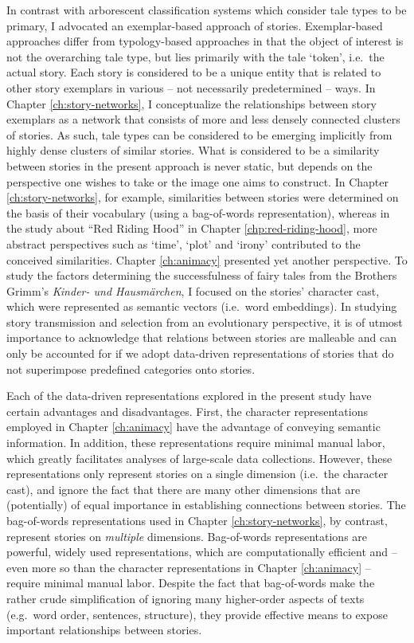 In contrast with arborescent classification systems which consider tale types to be primary, I advocated an exemplar-based approach of stories. Exemplar-based approaches differ from typology-based approaches in that the object of interest is not the overarching tale type, but lies primarily with the tale `token', i.e.\ the actual story\autocite[119]{frank:2010}. Each story is considered to be a unique entity that is related to other story exemplars in various -- not necessarily predetermined -- ways. In Chapter \ref{ch:story-networks}, I conceptualize the relationships between story exemplars as a network that consists of more and less densely connected clusters of stories. As such, tale types can be considered to be emerging implicitly from highly dense clusters of similar stories. What is considered to be a similarity between stories in the present approach is never static, but depends on the perspective one wishes to take or the image one aims to construct. In Chapter \ref{ch:story-networks}, for example, similarities between stories were determined on the basis of their vocabulary (using a bag-of-words representation), whereas in the study about ``Red Riding Hood'' in Chapter \ref{chp:red-riding-hood}, more abstract perspectives such as `time', `plot' and `irony' contributed to the conceived similarities. Chapter \ref{ch:animacy} presented yet another perspective. To study the factors determining the successfulness of fairy tales from the Brothers Grimm's \emph{Kinder- und Hausmärchen}, I focused on the stories' character cast, which were represented as semantic vectors (i.e.\ word embeddings). In studying story transmission and selection from an evolutionary perspective, it is of utmost importance to acknowledge that relations between stories are malleable and can only be accounted for if we adopt data-driven representations of stories that do not superimpose predefined categories onto stories.

Each of the data-driven representations explored in the present study have certain advantages and disadvantages. First, the character representations employed in Chapter \ref{ch:animacy} have the advantage of conveying semantic information. In addition, these representations require minimal manual labor, which greatly facilitates analyses of large-scale data collections. However, these representations only represent stories on a single dimension (i.e.\ the character cast), and ignore the fact that there are many other dimensions that are (potentially) of equal importance in establishing connections between stories. The bag-of-words representations used in Chapter \ref{ch:story-networks}, by contrast, represent stories on \emph{multiple} dimensions. Bag-of-words representations are powerful, widely used representations, which are computationally efficient and -- even more so than the character representations in Chapter \ref{ch:animacy} -- require minimal manual labor. Despite the fact that bag-of-words make the rather crude simplification of ignoring many higher-order aspects of texts (e.g.\ word order, sentences, structure), they provide effective means to expose important relationships between stories. 

